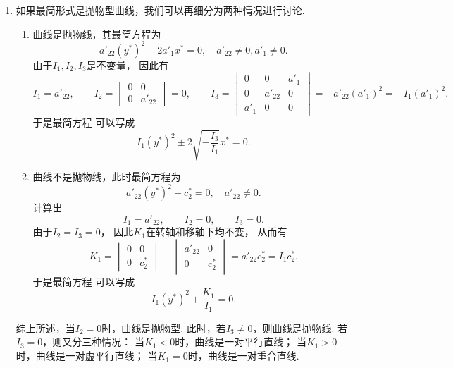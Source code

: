 \begin{enumerate}
	\item 如果最简形式是抛物型曲线，我们可以再细分为两种情况进行讨论.
	\begin{enumerate}
		\item 曲线是抛物线，其最简方程为\begin{equation*}
			a'_{22} (y^*)^2 + 2 a'_1 x^* = 0,
			\quad a'_{22} \neq 0, a'_1 \neq 0.
		\end{equation*}
		由于\(I_1,I_2,I_3\)是不变量，
		因此有\begin{equation*}
			I_1 = a'_{22},
			\qquad
			I_2 = \begin{vmatrix}
				0 & 0 \\
				0 & a'_{22}
			\end{vmatrix}
			= 0,
			\qquad
			I_3 = \begin{vmatrix}
				0 & 0 & a'_1 \\
				0 & a'_{22} & 0 \\
				a'_1 & 0 & 0
			\end{vmatrix}
			= - a'_{22} (a'_1)^2
			= - I_1 (a'_1)^2.
		\end{equation*}
		于是最简方程 
		可以写成\begin{equation*}
			I_1 (y^*)^2 \pm 2 \sqrt{-\frac{I_3}{I_1}} x^* = 0.
		\end{equation*}

		\item 曲线不是抛物线，此时最简方程为\begin{equation*}
			a'_{22} (y^*)^2 + c^*_2 = 0,
			\quad a'_{22} \neq 0.
		\end{equation*}
		计算出\begin{equation*}
			I_1 = a'_{22},
			\qquad
			I_2 = 0,
			\qquad
			I_3 = 0.
		\end{equation*}
		由于\(I_2 = I_3 = 0\)，
		因此\(K_1\)在转轴和移轴下均不变，
		从而有\begin{equation*}
			K_1
			= \begin{vmatrix}
				0 & 0 \\
				0 & c^*_2
			\end{vmatrix}
			+ \begin{vmatrix}
				a'_{22} & 0 \\
				0 & c^*_2
			\end{vmatrix}
			= a'_{22} c^*_2
			= I_1 c^*_2.
		\end{equation*}
		于是最简方程 
		可以写成\begin{equation*}
			I_1 (y^*)^2 + \frac{K_1}{I_1} = 0.
		\end{equation*}
	\end{enumerate}

	综上所述，当\(I_2 = 0\)时，曲线是抛物型.
	此时，若\(I_3 \neq 0\)，则曲线是抛物线.
	若\(I_3 = 0\)，则又分三种情况：
		当\(K_1 < 0\)时，曲线是一对平行直线；
		当\(K_1 > 0\)时，曲线是一对虚平行直线；
		当\(K_1 = 0\)时，曲线是一对重合直线.
\end{enumerate}

